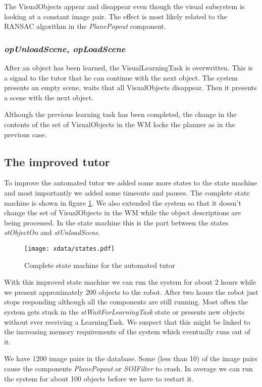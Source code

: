 \documentclass{article}
\begin{document}
The VisualObjects appear and disappear even though the visual subsystem is
looking at a constant image pair. The effect is most likely related to the
RANSAC algorithm in the {\em PlanePopout} component.

\subsubsection*{\em opUnloadScene, opLoadScene}

After an object has been learned, the VisualLearningTask is overwritten. This
is a signal to the tutor that he can continue with the next object. The system
presents an empty scene, waits that all VisualObjects disappear. Then it
presents a scene with the next object.

Although the previous learning task has been completed, the change in the
contents of the set of VisualObjects in the WM locks the planner as in the
previous case.

\subsection{The improved tutor}

To improve the automated tutor we added some more states to the state machine
and most importantly we added some timeouts and pauses. The complete state
machine is shown in figure \ref{fig:allStates}. We also extended the system so
that it doesn't change the set of VisualObjects in the WM while the object
descriptions are being processed. In the state machine this is the part between
the states {\em stObjectOn} and {\em stUnloadScene}.

\begin{figure}
\texttt{[image: xdata/states.pdf]}
\label{fig:allStates}
\caption{Complete state machine for the automated tutor}
\end{figure}

With this improved state machine we can run the system for about 2 hours while
we present approximately 200 objects to the robot. After two hours the robot
just stops responding although all the components are still running. Most often
the system gets stuck in the {\em stWaitForLearningTask} state or presents new
objects without ever receiving a LearningTask.  We suspect that this might be
linked to the increasing memory requirements of the system which eventually
runs out of it.

We have 1200 image pairs in the database. Some (less than 10) of the image
pairs cause the components {\em PlanePopout} or {\em SOIFilter} to crash. In
average we can run the system for about 100 objects before we have to restart
it.
\end{document}

